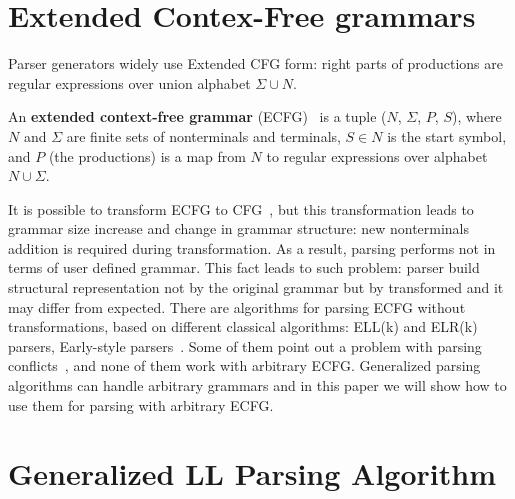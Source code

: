 \documentclass[runningheads,a4paper]{llncs}
\begin{document}



\section{Extended Contex-Free grammars}%
Parser generators widely use Extended CFG form: right parts of productions are regular 
expressions over union alphabet $\Sigma \cup N$. 
\begin{mydef}
An \textbf{extended context-free grammar} (ECFG)~\cite{ECFG} is a tuple ($N$, $\Sigma$, $P$, $S$), where $N$
and $\Sigma$ are finite sets of nonterminals and terminals, $ S\in N$ is the start symbol,
and $P$ (the productions) is a map from $N$ to regular expressions over alphabet $N \cup \Sigma$.
\end{mydef}

It is possible to transform ECFG to CFG~\cite{ELL}, but this transformation leads to grammar size 
increase and change in grammar structure: new nonterminals addition is required during transformation.
As a result, parsing performs not in terms of user defined grammar.
This fact leads to such problem: parser build structural representation not by the 
original grammar but by transformed and it may differ from expected.
There are algorithms for parsing ECFG without transformations, based on different classical algorithms: 
ELL(k) and ELR(k)~\cite{ELL} parsers, Early-style parsers~\cite{!!!}.
Some of them point out a problem with parsing conflicts~\cite{}, and none of them work with arbitrary ECFG.
Generalized parsing algorithms can handle arbitrary grammars and in this paper we
will show how to use them for parsing with arbitrary ECFG.




\section{Generalized LL Parsing Algorithm}%
\end{document}

